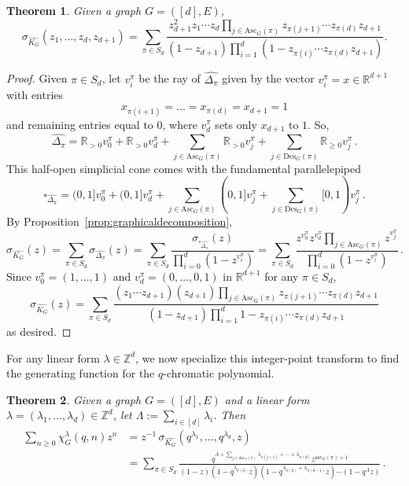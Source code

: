 \documentclass[11pt]{amsart}
\newtheorem{theorem}{Theorem}  [section] \numberwithin{equation}{section}
\newcommand{\des}{\mathrm{Des}}
\newcommand{\asc}{\mathrm{Asc}}
\newcommand{\ascnum}{\mathrm{asc}}
\begin{document}
\begin{theorem}\label{thm:multivariablechromaticgenerating}
    Given a graph $G=([d],E)$, 
    \[
        \sigma_{\widehat{K_G}}(z_1,\ldots,z_d,z_{d+1}) = \sum_{\pi \in S_d} \frac{ z_{d+1}^2 z_1 \cdots z_d \prod_{j \in \asc_G(\pi)} z_{\pi(j+1)} \cdots z_{\pi(d)} z_{d+1} }{(1-z_{d+1}) \prod_{i=1}^d (1-z_{\pi(i)} \cdots z_{\pi(d)} z_{d+1})}.
    \]
\end{theorem}
\begin{proof}
    Given $\pi \in S_d$, let $v^\pi_i$ be the ray of $\widehat{\Delta_\pi}$ given by the vector $v^\pi_i=x\in \mathbb{R}^{d+1}$ with entries 
    \[
    x_{\pi(i+1)} =\dots = x_{\pi(d)} = x_{d+1} = 1
    \]
    and remaining entries equal to $0$, where $v^\pi_d$ sets only $x_{d+1}$ to $1$. 
    So, 
        \[
            \widehat{\Delta_\pi} = \mathbb{R}_{>0} v^\pi_0 + \mathbb{R}_{>0} v^\pi_d + \sum_{j \in
            \asc_G(\pi)}\mathbb{R}_{>0} v^\pi_j + \sum_{j \in \des_G(\pi)} \mathbb{R}_{\geq 0} v^\pi_j \, .
        \]
    This half-open simplicial cone comes with the fundamental parallelepiped 
    \[
        \square_{\widehat{\Delta_\pi}} = (0,1] v^\pi_0 + (0,1]v^\pi_d + \sum_{j \in \asc_G(\pi)} (0,1]
        v^\pi_j + \sum_{j \in \des_G(\pi)} [0,1) v^\pi_j  \, .
    \]
    By Proposition~\ref{prop:graphicaldecomposition},
    \[
        \sigma_{\widehat{K_G}}(z) = \sum_{\pi \in S_d} \sigma_{\widehat{\Delta_\pi}}(z) = \sum_{\pi \in S_d}
\frac{\sigma_{\square_{\widehat{\Delta_\pi}}}(z)}{\prod_{i=0}^d (1-z^{v^\pi_i}) } = \sum_{\pi \in S_d}
\frac{z^{v^\pi_0} z^{v^\pi_d} \prod_{j \in \asc_G(\pi)} z^{v^\pi_j}} {\prod_{i=0}^d (1-z^{v^\pi_i}) } \, .
    \]
    Since $v^\pi_0= (1,\ldots,1)$ and $v^\pi_d = (0,\ldots,0,1)$ in $\mathbb{R}^{d+1}$ for any $\pi \in S_d$,
    \[
        \sigma_{\widehat{K_G}}(z) = \sum_{\pi \in S_d} \frac{(z_1 \cdots z_{d+1} ) (z_{d+1}) \prod_{j \in \asc_G(\pi)} z_{\pi(j+1)} \cdots z_{\pi(d)} z_{d+1}} {(1-z_{d+1}) \prod_{i=1}^d 1-z_{\pi(i)} \cdots z_{\pi(d)} z_{d+1}}
    \]
    as desired.
\end{proof}

For any linear form $\lambda \in \mathbb{Z}^d$, we now specialize this integer-point transform to find the generating function for the $q$-chromatic polynomial.

\begin{theorem}\label{thm:genfuncweighted}
    Given a graph $G = ([d],E)$ and a linear form $\lambda=(\lambda_1,\ldots,\lambda_d) \in \mathbb{Z}^d$, let
 $\Lambda := \sum_{i \in [d]} \lambda_i$. Then
\begin{align*}
        \sum_{n \geq 0} \chi^\lambda_G(q,n) z^n
        &= z^{-1} \, \sigma_{\widehat{K_G}}(q^{\lambda_1},\ldots,q^{\lambda_d},z) \\
        &= \sum_{\pi \in S_d} \frac{q^{\Lambda + \sum_{j \in \asc_G(\pi)} \lambda_{\pi(j+1)} + \cdots + \lambda_{\pi(d)}} z^{\ascnum_G(\pi)+1} }{(1-z)(1-q^{\lambda_{\pi(d)}}z) (1-q^{\lambda_{\pi(d)} + \lambda_{\pi(d-1)} } z) \cdots (1-q^\Lambda z)}  \, .
\end{align*} 

\end{theorem}
\end{document}
